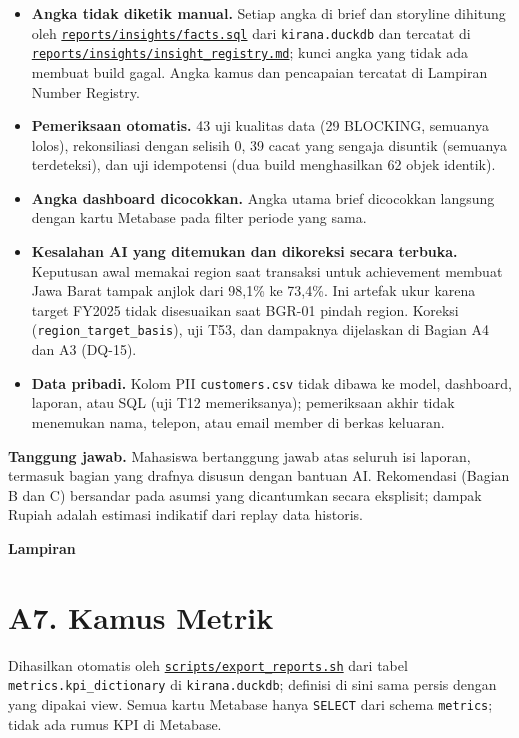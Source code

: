 \documentclass[10pt,a4paper]{article}
\providecommand{\tightlist}{\setlength{\itemsep}{1pt}\setlength{\parskip}{0pt}}
\newcommand{\bagian}[1]{\clearpage\phantomsection\addcontentsline{toc}{section}{#1}%
  {\centering\LARGE\bfseries\color{aksen} #1\par}\vspace{6pt}}
\begin{document}
\begin{itemize}
\tightlist
\item
  \textbf{Angka tidak diketik manual.} Setiap angka di brief dan storyline dihitung oleh \href{https://github.com/titan2903/kirana-omnichannel-performance-intelligence/blob/master/reports/insights/facts.sql}{\texttt{reports/insights/facts.sql}} dari \texttt{kirana.duckdb} dan tercatat di \href{https://github.com/titan2903/kirana-omnichannel-performance-intelligence/blob/master/reports/insights/insight_registry.md}{\texttt{reports/insights/insight\_\allowbreak{}registry.md}}; kunci angka yang tidak ada membuat build gagal. Angka kamus dan pencapaian tercatat di Lampiran Number Registry.
\item
  \textbf{Pemeriksaan otomatis.} 43 uji kualitas data (29 BLOCKING, semuanya lolos), rekonsiliasi dengan selisih 0, 39 cacat yang sengaja disuntik (semuanya terdeteksi), dan uji idempotensi (dua build menghasilkan 62 objek identik).
\item
  \textbf{Angka dashboard dicocokkan.} Angka utama brief dicocokkan langsung dengan kartu Metabase pada filter periode yang sama.
\item
  \textbf{Kesalahan AI yang ditemukan dan dikoreksi secara terbuka.} Keputusan awal memakai region saat transaksi untuk achievement membuat Jawa Barat tampak anjlok dari 98,1\% ke 73,4\%. Ini artefak ukur karena target FY2025 tidak disesuaikan saat BGR-01 pindah region. Koreksi (\texttt{region\_\allowbreak{}target\_\allowbreak{}basis}), uji T53, dan dampaknya dijelaskan di Bagian A4 dan A3 (DQ-15).
\item
  \textbf{Data pribadi.} Kolom PII \texttt{customers.csv} tidak dibawa ke model, dashboard, laporan, atau SQL (uji T12 memeriksanya); pemeriksaan akhir tidak menemukan nama, telepon, atau email member di berkas keluaran.
\end{itemize}

\textbf{Tanggung jawab.} Mahasiswa bertanggung jawab atas seluruh isi laporan, termasuk bagian yang drafnya disusun dengan bantuan AI. Rekomendasi (Bagian B dan C) bersandar pada asumsi yang dicantumkan secara eksplisit; dampak Rupiah adalah estimasi indikatif dari replay data historis.
\bagian{Lampiran}
\section{A7. Kamus Metrik}\label{a7.-kamus-metrik}

Dihasilkan otomatis oleh \href{https://github.com/titan2903/kirana-omnichannel-performance-intelligence/blob/master/scripts/export_reports.sh}{\texttt{scripts/export\_\allowbreak{}reports.sh}} dari tabel \texttt{metrics.kpi\_\allowbreak{}dictionary} di \texttt{kirana.duckdb}; definisi di sini
sama persis dengan yang dipakai view. Semua kartu Metabase hanya \texttt{SELECT} dari schema \texttt{metrics}; tidak ada rumus KPI di Metabase.
\end{document}
